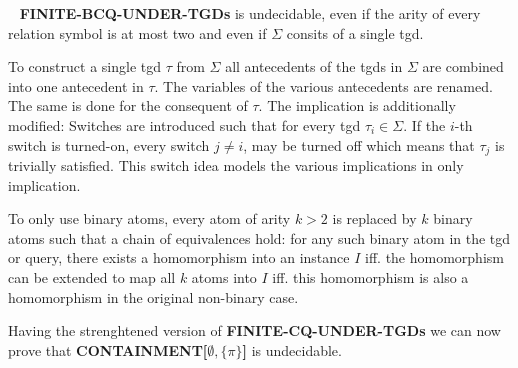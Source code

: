 \begin{theorem}\label{fundplus}~\cite{pichler2014containment}
	\textbf{FINITE-BCQ-UNDER-TGDs} is undecidable, even if the arity of every relation
	symbol is at most two and even if $\Sigma$ consits of a single tgd.
\end{theorem}

\begin{proofidea}
To construct a single tgd $\tau$ from $\Sigma$ all antecedents of the tgds in
$\Sigma$ are combined into one antecedent in $\tau$. The variables of the
various antecedents are renamed. The same is done for the consequent of $\tau$.
The implication is additionally modified: Switches are introduced such that for
every tgd $\tau_i \in \Sigma$. If the $i$-th switch is turned-on, every switch
$j\neq i$, may be turned off which means that $\tau_j$ is trivially satisfied.
This switch idea models the various implications in only implication.

To only use binary atoms, every atom of arity $k>2$ is replaced by $k$ binary
atoms such that a chain of equivalences hold: for any such binary atom in the
tgd or query, there exists a homomorphism into an instance $I$ iff. the
homomorphism can be extended to map all $k$ atoms into $I$ iff. this
homomorphism is also a homomorphism in the original non-binary case.
\end{proofidea}

Having the strenghtened version of \textbf{FINITE-CQ-UNDER-TGDs} we can now
prove that \textbf{CONTAINMENT[$\emptyset,\{\pi\}$]} is undecidable.

